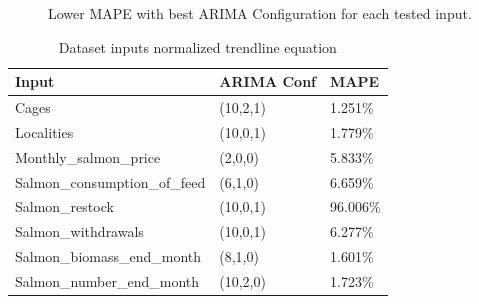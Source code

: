 \begin{figure}[H]
    \caption{Lower MAPE with best ARIMA Configuration for each tested input.}
\end{figure}

\begin{table}[ht] 
	\centering
    \begin{tabular}{ | l | l | l |}
            \hline
Input							&	ARIMA Conf	&	MAPE	\\ \hline
Cages							&	(10,2,1)	&	1.251\%	\\ \hline
Localities						&	(10,0,1)	&	1.779\%	\\ \hline
Monthly\_salmon\_price 			&	(2,0,0)		&	5.833\%	\\ \hline
Salmon\_consumption\_of\_feed	&	(6,1,0)		&	6.659\%	\\ \hline
Salmon\_restock 				&	(10,0,1)	&	96.006\%	\\ \hline
Salmon\_withdrawals 			&	(10,0,1)	&	6.277\%	\\ \hline
Salmon\_biomass\_end\_month		&	(8,1,0)		&	1.601\%	\\ \hline
Salmon\_number\_end\_month 		&	(10,2,0)	&	1.723\%	\\ \hline
    \end{tabular}  
    \caption{Dataset inputs normalized trendline equation}
    \label{table: Best ARIMA configurations with relative MAPE result in the Evaluation Test} 
\end{table}



